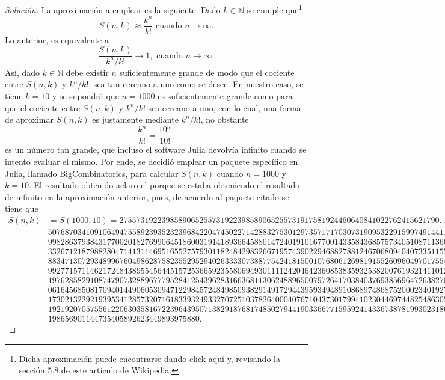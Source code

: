 \documentclass[10.5pt,notitlepage]{article}
\newenvironment{solucion}
  {\begin{proof}[Solución]}
  {\end{proof}}
\newcommand{\NN}{\mathbb{N}}
\theoremstyle{plain}
\begin{document}
\begin{solucion}
La aproximación a emplear es la siguiente: Dado \(k \in \NN\) se  cumple que\footnote{Dicha aproximación puede encontrarse dando click \href{https://en.wikipedia.org/wiki/Stirling_numbers_of_the_second_kind}{aquí} y, revisando la sección 5.8 de este artículo de Wikipedia.}
\[
S(n,k) \approx \frac{k^n}{k!} \text{ cuando } n \to \infty.
\]
Lo anterior, es equivalente a
\begin{equation*}
    \frac{S(n,k)}{k^{n}/k!} \to 1, \text{ cuando } n \to \infty.
\end{equation*}
Así, dado \(k \in \NN\) debe existir \(n\) suficientemente grande de modo que el cociente entre \(S(n,k)\) y \(k^n/k!\), sea tan cercano a uno como se desee. En nuestro caso, se tiene \(k = 10\) y se supondrá que \(n = 1000\) es suficientemente grande como para que el cociente entre \(S(n,k)\) y \(k^n/k!\) sea cercano a uno, con lo cual, una forma de aproximar \(S(n,k)\) es justamente mediante \(k^n/k!\), no obstante
\[
\frac{k^n}{k!} = \frac{10^n}{10!},
\]
es un número tan grande, que incluso el software Julia devolvía infinito cuando se intento evaluar el mismo. Por ende, se decidió emplear un paquete específico en Julia, llamado BigCombinatorics, para calcular \(S(n,k)\) cuando \(n = 1000\) y \(k=10\). El resultado obtenido aclaro el porque se estaba obteniendo el resultado de infinito en la aproximación anterior, pues, de acuerdo al paquete citado se tiene que 
{\tiny
\begin{align*}
    S(n,k) &= S(1000,10) =2755731922398589065255731922398589065255731917581924460640841022762415621790\hdots\\
    &50768703410910649475589239352323968422047450227142883275301297357171703073190953229159974914411337\\
    &99828637938431770020182769906451860031914189366458801472401910167700143358436857573405108711366373\\
    &33267121879882804714131146951655275793011824842983266719574390229468827881246706809404073351155347\\
    &88347130729348996760498628758235529529402633330738877542418150010768061269819155260960497017554445\\
    &99277157114621724843895545644515725366592355806949301111242046423608538359325382007619321411012236\\
    &19762858291087479073288967779528412543962831663681130624889650079726417038403769385696472638270748\\
    &06164568508170940144906053094712298457248498509382914917294439593494891086897486875200023401927187\\
    &17302132292193953412857320716183393249332707251037826400040767104373017994102304469744825486305919\\
    &19219207057556122063035816722396439507138291876817485027944190336677159592414336738781993023186143\\
    &198656901144735405892623449893975880.
\end{align*}}%
\end{solucion}
\newpage
\nocite{*}
\printbibliography
\end{document}

